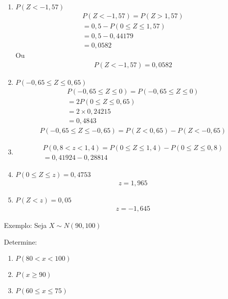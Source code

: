\begin{description}
\begin{enumerate}
    \item $ P(Z< -1,57)$
      \begin{align*}
        P(Z< -1,57) = P(Z> 1,57)\\
        =0,5 - P(0 \leq Z \leq 1,57) \\
        = 0,5 - 0,44179 \\
        = 0,0582
      \end{align*}
      Ou 
      \begin{align*}
        P(Z < -1,57) = 0,0582
      \end{align*}
    \item $P(-0,65 \leq Z \leq 0,65)$
      \begin{align*}
        P(-0,65 \leq Z \leq 0) = P(-0,65 \leq Z \leq 0) \\
        =2 P(0 \leq Z \leq 0,65) \\
        =2 \times 0,24215 \\
        =0,4843
      \end{align*}
      \begin{align*}
        P( -0,65 \leq Z \leq -0,65 ) = P(Z < 0,65) - P(Z < -0,65)
      \end{align*}
    \item 
      \begin{align*}
        P(0,8 < z < 1,4)  = P(0 \leq Z \leq 1,4) - P(0 \leq Z \leq 0,8) \\
        = 0,41924 - 0,28814
      \end{align*}
    \item $P(0 \leq Z \leq z) = 0,4753$
      \begin{align*}
       z= 1,965 
      \end{align*}
    \item $P(Z < z) = 0,05$
      \begin{align*}
       z= -1,645 
      \end{align*}
      \end{enumerate}

    \item {Exemplo:} Seja $X \sim N(90,100)$ \\
      \begin{description}
        \item  {Determine:}
      \begin{enumerate}[label=(\alph*)]
        \item $P(80 < x < 100)$
        \item $P(x \geq  90)$
        \item $P(60 \leq x \leq 75 )$
      \end{enumerate}


\end{description}
\end{description}
